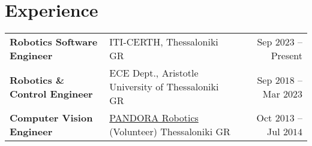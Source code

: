 \documentclass[a4paper,10pt,twoside]{article}
\begin{document}
\vfill

\section{\textbf{Experience}}\verticalspacebetweensectionandcontent\vspace{-1em}

\noindent\begin{center}\begin{tabular}{llr}
  \noindent\textbf{Robotics Software Engineer} & ITI-CERTH, Thessaloniki GR & {\small \textcolor{agray}{Sep $2023$ -- Present}} \\
  \noindent\textbf{Robotics \& Control Engineer} & ECE Dept., Aristotle University of Thessaloniki GR & {\small \textcolor{agray}{Sep $2018$ -- Mar $2023$}} \\
  \noindent \textbf{Computer Vision Engineer} & \href{https://issel.ee.auth.gr/pandora-robotics/}{PANDORA Robotics} (Volunteer) Thessaloniki GR & {\small \textcolor{agray}{Oct $2013$ -- Jul $2014$}}
\end{tabular}\end{center}
\verticalspacebetweensections

\vfill

\end{document}
